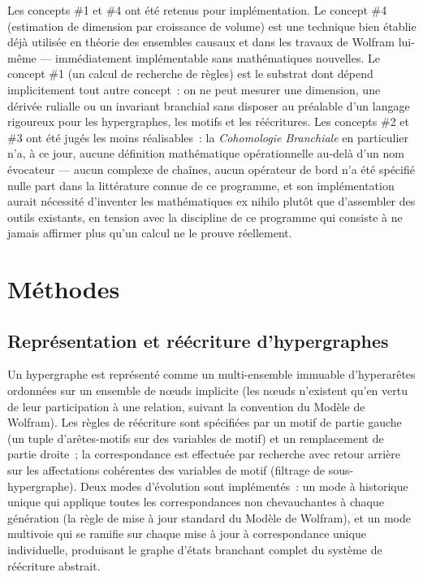 \documentclass[11pt,a4paper]{article}
\begin{document}
Les concepts \#1 et \#4 ont été retenus pour implémentation. Le concept
\#4 (estimation de dimension par croissance de volume) est une technique
bien établie déjà utilisée en théorie des ensembles causaux et dans les
travaux de Wolfram lui-même --- immédiatement implémentable sans
mathématiques nouvelles. Le concept \#1 (un calcul de recherche de règles)
est le substrat dont dépend implicitement tout autre concept~: on ne peut
mesurer une dimension, une dérivée rulialle ou un invariant branchial sans
disposer au préalable d'un langage rigoureux pour les hypergraphes, les
motifs et les réécritures. Les concepts \#2 et \#3 ont été jugés les moins
réalisables~: la \emph{Cohomologie Branchiale} en particulier n'a, à ce
jour, aucune définition mathématique opérationnelle au-delà d'un nom
évocateur --- aucun complexe de chaînes, aucun opérateur de bord n'a été
spécifié nulle part dans la littérature connue de ce programme, et son
implémentation aurait nécessité d'inventer les mathématiques ex nihilo
plutôt que d'assembler des outils existants, en tension avec la discipline
de ce programme qui consiste à ne jamais affirmer plus qu'un calcul ne le
prouve réellement.

\section{Méthodes}

\subsection{Représentation et réécriture d'hypergraphes}

Un hypergraphe est représenté comme un multi-ensemble immuable
d'hyperarêtes ordonnées sur un ensemble de nœuds implicite (les nœuds
n'existent qu'en vertu de leur participation à une relation, suivant la
convention du Modèle de Wolfram). Les règles de réécriture sont spécifiées
par un motif de partie gauche (un tuple d'arêtes-motifs sur des variables
de motif) et un remplacement de partie droite~; la correspondance est
effectuée par recherche avec retour arrière sur les affectations cohérentes
des variables de motif (filtrage de sous-hypergraphe). Deux modes
d'évolution sont implémentés~: un mode à historique unique qui applique
toutes les correspondances non chevauchantes à chaque génération (la règle
de mise à jour standard du Modèle de Wolfram), et un mode multivoie qui se
ramifie sur chaque mise à jour à correspondance unique individuelle,
produisant le graphe d'états branchant complet du système de réécriture
abstrait.
\end{document}
